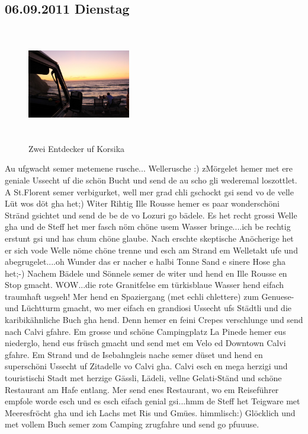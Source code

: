 \subsection{06.09.2011 Dienstag}
\begin{figure} 
  \begin{centering}
    \includegraphics[width=0.4\textwidth, height=5cm, keepaspectratio]{../Bilder/Korsika/18.jpg}
    \caption{Zwei Entdecker uf Korsika}
  \end{centering}
\end{figure} 
Au ufgwacht semer metemene rusche... Wellerusche :) zMörgelet hemer met ere geniale Ussecht uf die schön Bucht und send de au scho gli wederemal loszottlet.
A St.Florent semer verbigurket, well mer grad chli gschockt gsi send vo de velle Lüt wos döt gha het;) Witer Rihtig Ille Rousse hemer es paar wonderschöni Stränd gsichtet und send de be de vo Lozuri go bädele.
Es het recht grossi Welle gha und de Steff het mer fasch nöm chöne usem Wasser bringe....ich be rechtig erstunt gsi und has chum chöne glaube.
Nach erschte skeptische Anöcherige het er sich vode Welle nöme chöne trenne und esch am Strand em Welletakt ufe und abegrugelet....oh Wunder das er nacher e halbi Tonne Sand e sinere Hose gha het;-) Nachem Bädele und Sönnele semer de witer und hend en Ille Rousse en Stop gmacht.
WOW...die rote Granitfelse em türkisblaue Wasser hend eifach traumhaft usgseh! Mer hend en Spaziergang (met echli chlettere) zum Genuese- und Lüchtturm gmacht, wo mer eifach en grandiosi Ussecht ufs Städtli und die karibikähnliche Buch gha hend.
Denn hemer en feini Crepes verschlunge und send nach Calvi gfahre.
Em grosse und schöne Campingplatz La Pinede hemer eus niederglo, hend eus früsch gmacht und send met em Velo ed Downtown Calvi gfahre.
Em Strand und de Isebahngleis nache semer düset und hend en superschöni Ussecht uf Zitadelle vo Calvi gha.
Calvi esch en mega herzigi und touristischi Stadt met herzige Gässli, Lädeli, vellne Gelati-Ständ und schöne Restaurant am Hafe entlang.
Mer send enes Restaurant, wo em Reiseführer empfole worde esch und es esch eifach genial gsi...hmm de Steff het Teigware met Meeresfröcht gha und ich Lachs met Ris und Gmües. himmlisch:) Glöcklich und met vollem Buch semer zom Camping zrugfahre und send go pfuuuse. 

